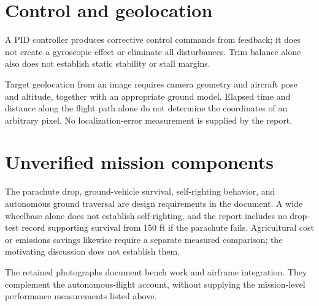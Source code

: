 \documentclass[11pt]{article}
\begin{document}
\section*{Control and geolocation}
A PID controller produces corrective control commands from feedback; it does
not create a gyroscopic effect or eliminate all disturbances. Trim balance
alone also does not establish static stability or stall margins.

Target geolocation from an image requires camera geometry and aircraft pose
and altitude, together with an appropriate ground model. Elapsed time and
distance along the flight path alone do not determine the coordinates of an
arbitrary pixel. No localization-error measurement is supplied by the report.

\section*{Unverified mission components}
The parachute drop, ground-vehicle survival, self-righting behavior, and
autonomous ground traversal are design requirements in the document. A wide
wheelbase alone does not establish self-righting, and the report includes no
drop-test record supporting survival from 150 ft if the parachute fails.
Agricultural cost or emissions savings likewise require a separate measured
comparison; the motivating discussion does not establish them.

The retained photographs document bench work and airframe integration. They
complement the autonomous-flight account, without supplying the mission-level
performance measurements listed above.
\end{document}

